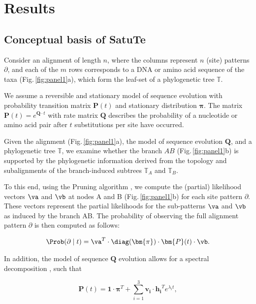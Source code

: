 \section*{Results}
\subsection*{Conceptual basis of SatuTe}\label{sec:SatuTe}

Consider an alignment of length $n$, where the columns represent $n$ (site) patterns $\partial$, and each of the $m$ rows corresponds to a DNA or amino acid sequence of the taxa (Fig.\,\ref{fig:panel1}a), which form the leaf-set of a phylogenetic tree $\mathbb{T}$.

We assume a reversible and stationary model of sequence evolution  with probability transition matrix $\bm{P}(t)$ and stationary distribution $\bm{\pi}$. The matrix $\bm{P}(t) = e^{\bm{Q}\cdot t}$ with rate matrix $\bm{Q}$ describes the probability of a nucleotide or amino acid pair after $t$ substitutions per site have occurred. 

\medskip

Given the alignment (Fig.\,\ref{fig:panel1}a), the model of sequence evolution $\bm{Q}$, and a phylogenetic tree $\mathbb{T}$, we examine whether the branch $AB$ (Fig.\,\ref{fig:panel1}b) is supported by the phylogenetic information derived from the topology and subalignments of the branch-induced subtrees $\mathbb{T}_A$ and $\mathbb{T}_B$.

\medskip

To this end, using the Pruning algorithm , we compute the (partial) likelihood vectors $\va$ and $\vb$  at nodes A and B (Fig.\,\ref{fig:panel1}b) for each site pattern $\partial$. These vectors represent the partial likelihoods for the sub-patterns  $\va$ and $\vb$  as induced by the branch AB. The probability of observing the full alignment pattern $\partial$ is then computed as follows:

\begin{equation} \label{eq:branch_likelihood_given_t} \Prob(\partial \mid t)  = \va^T \cdot\diag (\bm{\pi})\cdot \bm{P}(t) \cdot\vb.
\end{equation}


In addition, the model of sequence $\bm{Q}$ evolution allows for a spectral decomposition , such that

\begin{equation} \label{eq:spectral_decomposition}
   \bm{P}(t) = \bm{1}\cdot\bm{\pi}^T + \sum_{i=1}^3\bm{v_i}\cdot \bm{h_i}^T e^{\lambda_it},
\end{equation}
 
